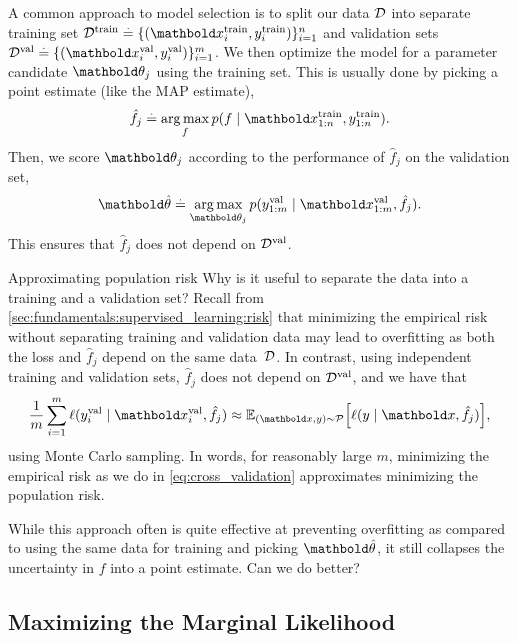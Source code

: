 A common approach to model selection is to split our data $\mathcal{D}$ into separate training set $\spD^\train \defeq \{(\vx_i^\train, y_i^\train)\}_{i=1}^n$ and validation sets $\spD^\val \defeq \{(\vx_i^\val, y_i^\val)\}_{i=1}^m$.
We then optimize the model for a parameter candidate $\vtheta_j$ using the training set.
This is usually done by picking a point estimate (like the MAP estimate), \begin{align}
  \hat{f}_j \defeq \argmax_{f } p(f \mid \vx_{1:n}^\train, y_{1:n}^\train).
\end{align}
Then, we score $\vtheta_j$ according to the performance of $\hat{f}_j$ on the validation set, \begin{align}
  \vthetahat \defeq \argmax_{\vtheta_j} p(y_{1:m}^\val \mid \vx_{1:m}^\val, \hat{f_j}). \label{eq:cross_validation}
\end{align}
This ensures that $\hat{f}_j$ does not depend on $\mathcal{D}^{\mathrm{val}}$.

\begin{rmk}{Approximating population risk}{}
  Why is it useful to separate the data into a training and a validation set?
  Recall from \cref{sec:fundamentals:supervised_learning:risk} that minimizing the empirical risk without separating training and validation data may lead to overfitting as both the loss and $\hat{f}_j$ depend on the same data~$\mathcal{D}$.
  In contrast, using independent training and validation sets, $\hat{f}_j$ does not depend on $\mathcal{D}^{\mathrm{val}}$, and we have that \begin{align}
    \frac{1}{m} \sum_{i=1}^m \ell(y_i^\val \mid \vx_i^\val, \hat{f}_j) \approx \E[(\vx,y)\sim\spP]{\ell(y \mid \vx, \hat{f}_j)},
  \end{align} using Monte Carlo sampling.
  In words, for reasonably large $m$, minimizing the empirical risk as we do in \cref{eq:cross_validation} approximates minimizing the population risk.
\end{rmk}

While this approach often is quite effective at preventing overfitting as compared to using the same data for training and picking $\vthetahat$, it still collapses the uncertainty in $f$ into a point estimate.
Can we do better?

\subsection{Maximizing the Marginal Likelihood}\label{sec:gp:model_selection:marginal_likelihood}

